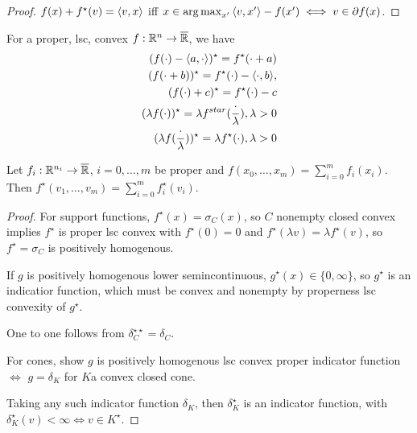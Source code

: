 \begin{proof}
  $f(x) + f^{\star}(v) = \IP{v, x}$ iff $x \in \argmax_{x'} \IP{v, x'}
  - f(x') \iff v \in \partial f(x)$.
\end{proof}

\begin{thm}
  \label{sec:conjugate-functions-10}
  For a proper, lsc, convex $f: \mathbb{R}^{n} \rightarrow \overline {\mathbb{R}}$, we
  have
  \begin{align}
    \label{eq:23}
    (f(\cdot) - \IP{a, \cdot})^{\star} = f^{\star}(\cdot + a) \\
    \label{eq:24}
    (f(\cdot + b))^{\star} = f^{\star}(\cdot) - \IP{\cdot, b}, \\
    \label{eq:25}
    (f(\cdot) + c)^{\star} = f^{\star}(\cdot) - c \\
    \label{eq:26}
    (\lambda f(\cdot))^{\star} = \lambda
    f^{star}(\frac{\cdot}{\lambda}), \lambda > 0 \\
    \label{eq:27}
    (\lambda f(\frac{\cdot}{\lambda} ))^{\star} = \lambda
    f^{\star}(\cdot), \lambda > 0
  \end{align}
\end{thm}

\begin{thm}
  \label{sec:conjugate-functions-11}
  Let $f_{i}: \mathbb{R}^{n_{i}} \rightarrow \overline {\mathbb{R}}$, $i = 0, \dots, m$
  be proper and $f(x_{0}, \dots, x_{m}) = \sum_{i=0}^{m}
  f_{i}(x_{i})$.  Then $f^{\star}(v_{1}, \dots, v_{m}) = \sum_{i=0}^{m} f^{\star}_{i}(v_{i})$.
\end{thm}

\begin{proof}
  For support functions, $f^{\star}(x) = \sigma_{C}(x)$, so $C$
  nonempty closed convex implies $f^{\star}$ is proper lsc convex with
  $f^{\star}(0) = 0$ and $f^{\star}(\lambda v) = \lambda
  f^{\star}(v)$, so $f^{\star} = \sigma_{C}$ is positively homogenous.

  If $g$ is positively homogenous lower semincontinuous, $g^{\star}(x)
  \in \{ 0, \infty \} $, so $g^{\star}$ is an indicatior function,
  which must be convex and nonempty by properness lsc convexity of
  $g^{\star}$.

  One to one follows from $\delta^{\star \star}_{C} = \delta_{C}$.

  For cones, show $g$ is positively homogenous lsc convex proper
  indicator function $\iff$ $g = \delta_{K}$ for $K$a convex closed
  cone.

  Taking any such indicator function $\delta_{K}$, then
  $\delta_{K}^{\star}$ is an indicator function, with
  $\delta_{K}^{\star}(v) < \infty \iff v \in K^{\star}$.
\end{proof}

